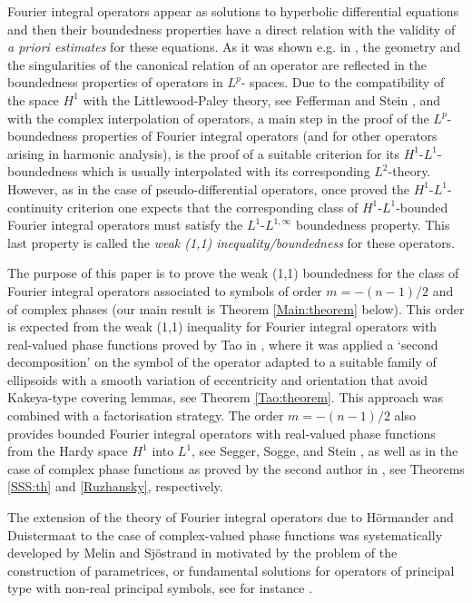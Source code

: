 \documentclass[12pt, reqno]{amsart}
\theoremstyle{definition}
\theoremstyle{remark}
\numberwithin{equation}{section}
\begin{document}
Fourier integral operators appear as solutions to hyperbolic differential equations and then their boundedness properties have a direct relation with the validity of {\it a priori estimates} for these equations. As it was shown e.g. in \cite{Ruzhansky:CWI-book,SSS,Tao},  the geometry and the singularities of the canonical
relation of an operator are reflected in the boundedness properties of operators in $L^p$-
spaces. Due to the compatibility of the  space $H^1$ with the Littlewood-Paley theory, see Fefferman and Stein \cite{FeffermanStein1972}, and with the complex interpolation of operators, a main step in the proof of the $L^p$-boundedness properties of Fourier integral operators (and for other operators arising in harmonic analysis), is the proof of a suitable criterion for its $H^1$-$L^1$-boundedness which is usually  interpolated with its corresponding $L^2$-theory. However, as in the case of pseudo-differential operators, once proved the $H^1$-$L^1$-continuity criterion one expects that the corresponding class of  $H^1$-$L^1$-bounded Fourier integral operators must satisfy the $L^{1}$-$L^{1,\infty}$ boundedness property. This last property is called the {\it weak (1,1) inequality/boundedness} for these operators.    

The purpose of this paper is to prove the weak (1,1) boundedness for the class of Fourier integral operators associated to symbols of order $m=-(n-1)/2$ and of complex phases (our main result is Theorem \ref{Main:theorem} below).  This order is expected from the weak (1,1) inequality for Fourier integral operators with real-valued phase functions proved by Tao in \cite{Tao}, where it was applied a `second decomposition' on the symbol of the operator adapted to a suitable family of ellipsoids with a smooth variation of eccentricity and orientation that avoid Kakeya-type covering lemmas, see Theorem \ref{Tao:theorem}. This approach was combined with a factorisation strategy. The order $m=-(n-1)/2$ also provides bounded Fourier integral operators with real-valued phase functions from the Hardy space $H^{1}$ into $L^1$, see Segger, Sogge, and Stein \cite{SSS}, as well as in the case of complex phase functions as proved by the second author in \cite{Ruzhansky:CWI-book}, see Theorems \ref{SSS:th} and \ref{Ruzhansky}, respectively. 


The extension of the theory of Fourier integral operators due to H\"ormander and Duistermaat to the case of complex-valued phase functions was systematically developed by Melin and Sj\"ostrand in \cite{Melin:Sjostrand1975} motivated by the problem of the construction of parametrices, or fundamental solutions for operators of principal type with non-real principal symbols, see for instance \cite{Melin:Sjostrand1976}.
\end{document}
